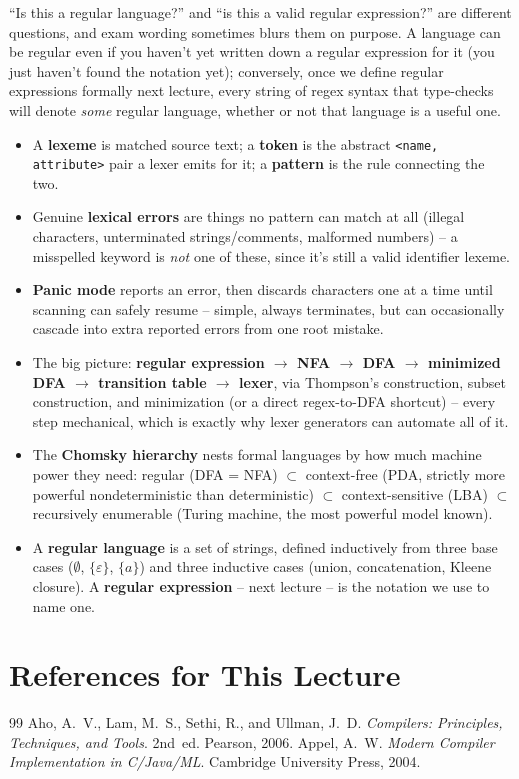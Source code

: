 \documentclass[full-course-notes.tex]{subfiles}
\begin{document}
\begin{examfocus}
``Is this a regular language?'' and ``is this a valid regular expression?'' are different
questions, and exam wording sometimes blurs them on purpose. A language can be regular even if
you haven't yet written down a regular expression for it (you just haven't found the notation
yet); conversely, once we define regular expressions formally next lecture, every string of
regex syntax that type-checks will denote \emph{some} regular language, whether or not that
language is a useful one.
\end{examfocus}

\begin{takeaways}
\begin{itemize}
  \item A \textbf{lexeme} is matched source text; a \textbf{token} is the abstract
  \texttt{<name, attribute>} pair a lexer emits for it; a \textbf{pattern} is the rule
  connecting the two.
  \item Genuine \textbf{lexical errors} are things no pattern can match at all (illegal
  characters, unterminated strings/comments, malformed numbers) -- a misspelled keyword is
  \emph{not} one of these, since it's still a valid identifier lexeme.
  \item \textbf{Panic mode} reports an error, then discards characters one at a time until
  scanning can safely resume -- simple, always terminates, but can occasionally cascade into
  extra reported errors from one root mistake.
  \item The big picture: \textbf{regular expression $\to$ NFA $\to$ DFA $\to$ minimized DFA
  $\to$ transition table $\to$ lexer}, via Thompson's construction, subset construction, and
  minimization (or a direct regex-to-DFA shortcut) -- every step mechanical, which is exactly
  why lexer generators can automate all of it.
  \item The \textbf{Chomsky hierarchy} nests formal languages by how much machine power they
  need: regular (DFA = NFA) $\subset$ context-free (PDA, strictly more powerful
  nondeterministic than deterministic) $\subset$ context-sensitive (LBA) $\subset$ recursively
  enumerable (Turing machine, the most powerful model known).
  \item A \textbf{regular language} is a set of strings, defined inductively from three base
  cases ($\emptyset$, $\{\varepsilon\}$, $\{a\}$) and three inductive cases (union,
  concatenation, Kleene closure). A \textbf{regular expression} -- next lecture -- is the
  notation we use to name one.
\end{itemize}
\end{takeaways}

\section*{References for This Lecture}
\begin{thebibliography}{99}
 Aho, A.~V., Lam, M.~S., Sethi, R., and Ullman, J.~D. \textit{Compilers:
Principles, Techniques, and Tools}. 2nd~ed. Pearson, 2006.
 Appel, A.~W. \textit{Modern Compiler Implementation in C/Java/ML}. Cambridge
University Press, 2004.
\end{thebibliography}
\end{document}
